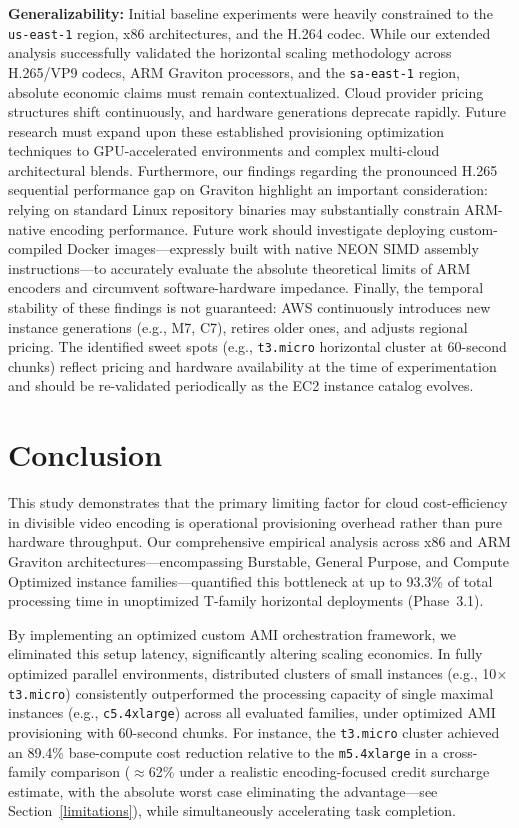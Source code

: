 \documentclass[conference]{IEEEtran}
\begin{document}
\textbf{Generalizability:} Initial baseline experiments were heavily constrained to the \texttt{us-east-1} region, x86 architectures, and the H.264 codec. While our extended analysis successfully validated the horizontal scaling methodology across H.265/VP9 codecs, ARM Graviton processors, and the \texttt{sa-east-1} region, absolute economic claims must remain contextualized. Cloud provider pricing structures shift continuously, and hardware generations deprecate rapidly. Future research must expand upon these established provisioning optimization techniques to GPU-accelerated environments and complex multi-cloud architectural blends. Furthermore, our findings regarding the pronounced H.265 sequential performance gap on Graviton highlight an important consideration: relying on standard Linux repository binaries may substantially constrain ARM-native encoding performance. Future work should investigate deploying custom-compiled Docker images—expressly built with native NEON SIMD assembly instructions—to accurately evaluate the absolute theoretical limits of ARM encoders and circumvent software-hardware impedance. Finally, the temporal stability of these findings is not guaranteed: AWS continuously introduces new instance generations (e.g., M7, C7), retires older ones, and adjusts regional pricing. The identified sweet spots (e.g., \texttt{t3.micro} horizontal cluster at 60-second chunks) reflect pricing and hardware availability at the time of experimentation and should be re-validated periodically as the EC2 instance catalog evolves.

\section{Conclusion}
\label{conclusion}

This study demonstrates that the primary limiting factor for cloud cost-efficiency in divisible video encoding is operational provisioning overhead rather than pure hardware throughput. Our comprehensive empirical analysis across x86 and ARM Graviton architectures---encompassing Burstable, General Purpose, and Compute Optimized instance families---quantified this bottleneck at up to 93.3\% of total processing time in unoptimized T-family horizontal deployments (Phase~3.1). 

By implementing an optimized custom AMI orchestration framework, we eliminated this setup latency, significantly altering scaling economics. In fully optimized parallel environments, distributed clusters of small instances (e.g., 10$\times$ \texttt{t3.micro}) consistently outperformed the processing capacity of single maximal instances (e.g., \texttt{c5.4xlarge}) across all evaluated families, under optimized AMI provisioning with 60-second chunks. For instance, the \texttt{t3.micro} cluster achieved an 89.4\% base-compute cost reduction relative to the \texttt{m5.4xlarge} in a cross-family comparison ($\approx$62\% under a realistic encoding-focused credit surcharge estimate, with the absolute worst case eliminating the advantage---see Section~\ref{limitations}), while simultaneously accelerating task completion.  
\end{document}
